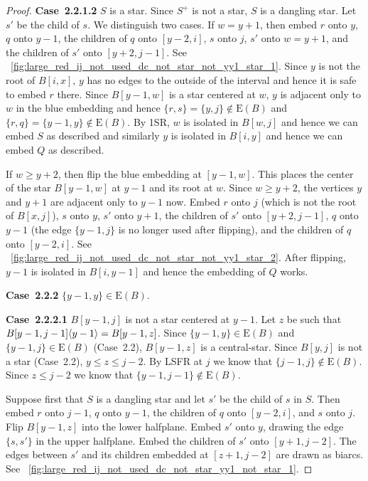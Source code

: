 \documentclass[11pt,a4paper,colorlinks=true,urlcolor=blue,citecolor=red]{article}
\theoremstyle{plain}
\newcommand{\case}[1]{\par\vspace{.5\baselineskip}\noindent\textbf{\sffamily Case~#1}}
\newcommand{\EB}{\mathrm{E}(B)}
\begin{document}
\begin{proof}
  \case{2.2.1.2} $S$ is a star. Since $S^+$ is not a star, $S$ is a
  dangling star. Let $s'$ be the child of $s$. We distinguish two cases.
  If $w=y+1$, then embed $r$ onto $y$, $q$ onto $y-1$, the children of
  $q$ onto $[y-2,i]$, $s$ onto $j$, $s'$ onto $w=y+1$, and the children
  of $s'$ onto $[y+2,j-1]$. See
  \figurename~\ref{fig:large_red_ij_not_used_dc_not_star_not_yy1_star_1}.
  Since $y$ is not the root of $B[i,x]$, $y$ has no edges to the outside
  of the interval and hence it is safe to embed $r$ there. Since
  $B[y-1,w]$ is a star centered at $w$, $y$ is adjacent only to $w$ in
  the blue embedding and hence $\{r,s\}=\{y,j\}\not\in\EB$ and
  $\{r,q\}=\{y-1,y\}\not\in\EB$. By 1SR, $w$ is isolated in $B[w,j]$ and
  hence we can embed $S$ as described and similarly $y$ is isolated in
  $B[i,y]$ and hence we can embed $Q$ as described.

  If $w\geq y+2$, then flip the blue embedding at $[y-1,w]$. This
  places the center of the star $B[y-1,w]$ at $y-1$ and its root at $w$.
  Since $w\geq y+2$, the vertices $y$ and $y+1$ are adjacent only to
  $y-1$ now. Embed $r$ onto $j$ (which is not the root of $B[x,j]$), $s$
  onto $y$, $s'$ onto $y+1$, the children of $s'$ onto $[y+2,j-1]$, $q$
  onto $y-1$ (the edge $\{y-1,j\}$ is no longer used after flipping),
  and the children of $q$ onto $[y-2,i]$. See
  \figurename~\ref{fig:large_red_ij_not_used_dc_not_star_not_yy1_star_2}.
  After flipping, $y-1$ is isolated in $B[i,y-1]$ and hence the
  embedding of $Q$ works.

  \case{2.2.2} $\{y-1,y\}\in\EB$.

  \case{2.2.2.1} $B[y-1,j]$ is not a star centered at $y-1$. Let $z$ be
  such that $B{[y-1,j-1]}\langle{y-1}\rangle=B[y-1,z]$. Since $\{y-1,y\}\in\EB$
  and $\{y-1,j\}\in\EB$ (Case~2.2), $B[y-1,z]$ is a central-star. Since
  $B[y,j]$ is not a star (Case~2.2), $y\leq z\leq j-2$. By LSFR at $j$
  we know that $\{j-1,j\}\not\in\EB$. Since $z\leq j-2$ we know that
  $\{y-1,j-1\}\not\in\EB$.

  Suppose first that $S$ is a dangling star and let $s'$ be the child of
  $s$ in $S$. Then embed $r$ onto $j-1$, $q$ onto $y-1$, the children of
  $q$ onto $[y-2,i]$, and $s$ onto $j$. Flip $B[y-1,z]$ into the lower
  halfplane. Embed $s'$ onto $y$, drawing the edge $\{s,s'\}$ in the
  upper halfplane. Embed the children of $s'$ onto $[y+1,j-2]$. The
  edges between $s'$ and its children embedded at $[z+1,j-2]$ are drawn
  as biarcs. See
  \figurename~\ref{fig:large_red_ij_not_used_dc_not_star_yy1_not_star_1}.


\end{proof}
\end{document}
